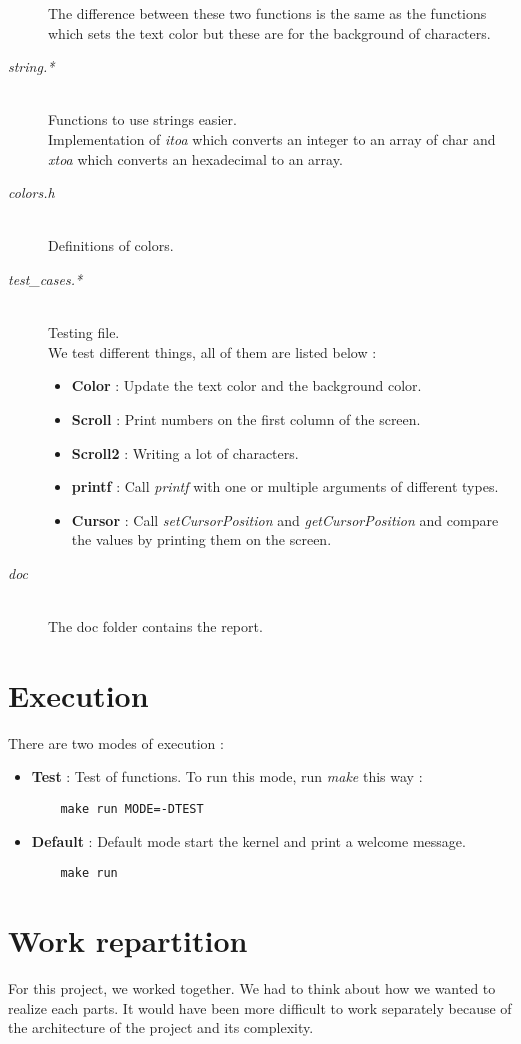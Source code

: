 \documentclass[a4paper]{article}
\begin{document}
\begin{description}
The difference between these two functions is the same as the functions which sets the text color but these are for the background of characters.

\item[\textit{string.*}] \hfill \\
Functions to use strings easier. \\
Implementation of \textit{itoa} which converts an integer to an array of char and \textit{xtoa} which converts an hexadecimal to an array.

\item[\textit{colors.h}] \hfill \\
Definitions of colors.

\item[\textit{test\_cases.*}] \hfill \\
Testing file.\\
We test different things, all of them are listed below :
\begin{itemize}
\item \textbf{Color} : Update the text color and the background color.
\item \textbf{Scroll} : Print numbers on the first column of the screen.
\item \textbf{Scroll2} : Writing a lot of characters.
\item \textbf{printf} : Call \textit{printf} with one or multiple arguments of different types.
\item \textbf{Cursor} : Call \textit{setCursorPosition} and \textit{getCursorPosition} and compare the values by printing them on the screen.
\end{itemize}

\item[\textit{doc}] \hfill \\
The doc folder contains the report.

\end{description}
\newpage
\section{Execution}

There are two modes of execution : 

\begin{itemize}
  \item \textbf{Test} : Test of functions. To run this mode, run \textit{make} this way :
    \begin{verbatim}
    make run MODE=-DTEST
    \end{verbatim}
  \item \textbf{Default} : Default mode start the kernel and print a welcome message.
    \begin{verbatim}
    make run
    \end{verbatim}
\end{itemize}

\section{Work repartition}
For this project, we worked together. We had to think about how we wanted to realize each parts. It would have been more difficult to work separately because of the architecture of the project and its complexity.
\end{document}
